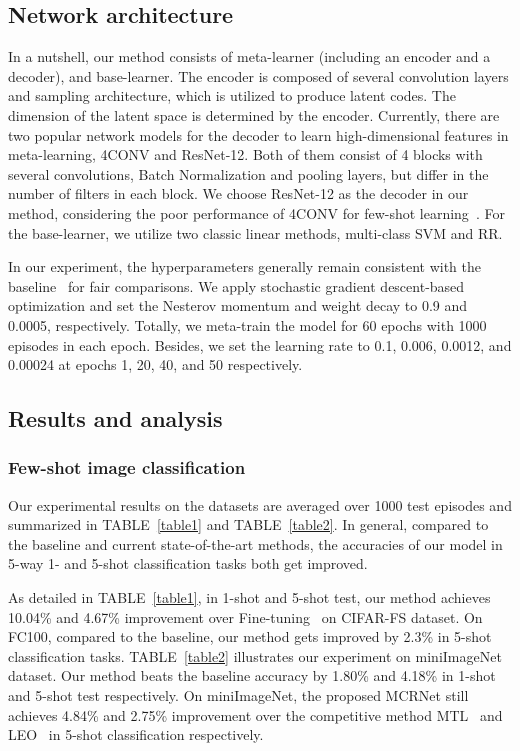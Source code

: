\documentclass[10pt,conference,a4paper]{IEEEtran}
\begin{document}
\subsection{Network architecture}
In a nutshell, our method consists of meta-learner (including an encoder and a decoder), and base-learner. The encoder is composed of several convolution layers and sampling architecture, which is utilized to produce latent codes. The dimension of the latent space is determined by the encoder. Currently, there are two popular network models for the decoder to learn high-dimensional features in meta-learning, 4CONV and ResNet-12. Both of them consist of 4 blocks with several convolutions, Batch Normalization and pooling layers, but differ in the number of filters in each block. We choose ResNet-12 as the decoder in our method, considering the poor performance of 4CONV for few-shot learning~\cite{Sun2019Meta}. For the base-learner, we utilize two classic linear methods, multi-class SVM and RR.

In our experiment, the hyperparameters generally remain consistent with the baseline~\cite{lee2019meta} for fair comparisons. We apply stochastic gradient descent-based optimization and set the Nesterov momentum and weight decay to 0.9 and 0.0005, respectively. Totally, we meta-train the model for 60 epochs with 1000 episodes in each epoch. Besides, we set the learning rate to 0.1, 0.006, 0.0012, and 0.00024 at epochs 1, 20, 40, and 50 respectively.

\subsection{Results and analysis}
\subsubsection{\textbf{Few-shot image classification}}
Our experimental results on the datasets are averaged over 1000 test episodes and summarized in TABLE~\ref{table1} and TABLE~\ref{table2}. In general, compared to the baseline and current state-of-the-art methods, the accuracies of our model in 5-way 1- and 5-shot classification tasks both get improved. 

As detailed in TABLE~\ref{table1}, in 1-shot and 5-shot test, our method achieves 10.04\% and 4.67\% improvement over Fine-tuning~\cite{DBLP:journals/corr/abs-1909-02729} on CIFAR-FS dataset. On FC100, compared to the baseline, our method gets improved by 2.3\% in 5-shot classification tasks. TABLE~\ref{table2} illustrates our experiment on miniImageNet dataset. Our method beats the baseline accuracy by 1.80\% and 4.18\% in 1-shot and 5-shot test respectively. On miniImageNet, the proposed MCRNet still achieves 4.84\% and 2.75\% improvement over the competitive method MTL~\cite{Sun2019Meta} and LEO~\cite{rusu2019meta} in 5-shot classification respectively.
\end{document}
